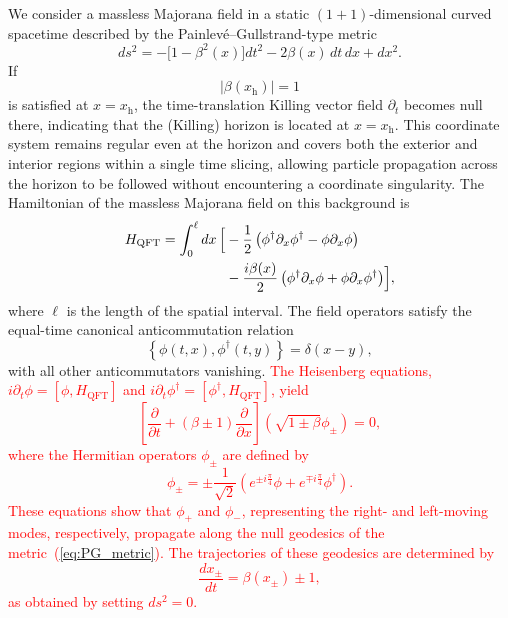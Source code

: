\documentclass[reprint,amsmath,amssymb,aps,prb,showkeys,superscriptaddress]{revtex4-2}
\newcommand{\red}{\textcolor{red}}
\begin{document}
We consider a massless Majorana field in a static
$(1+1)$-dimensional curved spacetime described by the
Painlev\'e--Gullstrand-type metric
\begin{equation}
  ds^2
  =
  -\bigl[1-\beta^2(x)\bigr]dt^2
  -2\beta(x)\,dt\,dx
  +dx^2.
  \label{eq:PG_metric}
\end{equation}
If 
\begin{equation}
  \bigl|\beta(x_{\mathrm h})\bigr|=1 
  \label{eq:horizon_condition}
\end{equation}
is satisfied at $x=x_{\mathrm h}$, the time-translation Killing vector field $\partial_t$ becomes null there, 
indicating that the (Killing) horizon is located at $x=x_{\mathrm h}$.
This coordinate system remains regular even at the horizon and covers both the
exterior and interior regions within a single time slicing, allowing
particle propagation across the horizon to be followed without
encountering a coordinate singularity. 
The Hamiltonian of the massless Majorana field on this background is
\begin{equation}
\begin{aligned}
  H_{\mathrm{QFT}}
  =
  \int_0^\ell dx\,
  \Bigl[
  &-\frac{1}{2}
  \left(
    \phi^\dagger\partial_x\phi^\dagger
    -
    \phi\partial_x\phi
  \right)
  \\
  &-\frac{i\beta(x)}{2}
  \left(
    \phi^\dagger\partial_x\phi
    +
    \phi\partial_x\phi^\dagger
  \right)
  \Bigr],
\end{aligned}
  \label{eq:continuum_Hamiltonian}
\end{equation}
where $\ell$ is the length of the spatial interval. The field
operators satisfy the equal-time canonical anticommutation relation
\begin{equation}
  \left\{
    \phi(t,x),\phi^{\dagger}(t,y)
  \right\}
  =
  \delta(x-y),
\label{eq:continuum_anticommutation}
\end{equation}
with all other anticommutators vanishing.
\red{
The Heisenberg equations,
$i\partial_t \phi = [\phi, H_{\mathrm{QFT}}]$ and $i\partial_t \phi^{\dagger} = [\phi^{\dagger}, H_{\mathrm{QFT}}]$,  
yield  
\begin{equation}
    \left[\frac{\partial}{\partial t} + (\beta \pm 1) \frac{\partial}{\partial x}\right] (\sqrt{1\pm \beta} \phi_\pm) = 0 ,
\end{equation}
where the Hermitian operators $\phi_\pm$ are defined by 
\begin{equation}
    \phi_\pm = \pm \frac{1}{\sqrt{2}} \left(e^{\pm i \frac{\pi}{4}} \phi + e^{\mp i \frac{\pi}{4}} \phi^\dagger \right) .
\end{equation}
These equations show that $\phi_+$ and $\phi_-$, representing the right- and left-moving modes, respectively, propagate along the null geodesics of the metric~(\ref{eq:PG_metric}). 
The trajectories of these geodesics are determined by 
\begin{equation}
    \frac{dx_\pm}{dt}=\beta(x_\pm) \pm 1,
\end{equation}
as obtained by setting $ds^2 = 0$.
}
\end{document}
